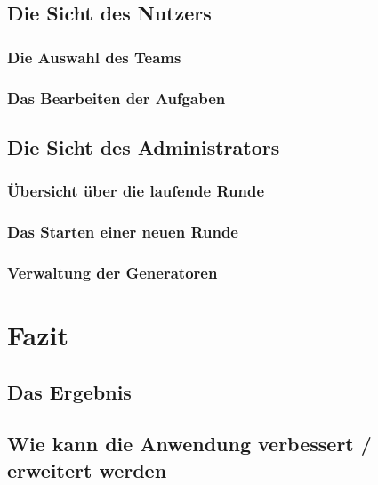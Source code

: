 \section{Die Sicht des Nutzers}

\subsection{Die Auswahl des Teams}

\subsection{Das Bearbeiten der Aufgaben}

\section{Die Sicht des Administrators}

\subsection{Übersicht über die laufende Runde}

\subsection{Das Starten einer neuen Runde}

\subsection{Verwaltung der Generatoren}



\chapter{Fazit}

\section{Das Ergebnis}

\section{Wie kann die Anwendung verbessert / erweitert werden}



